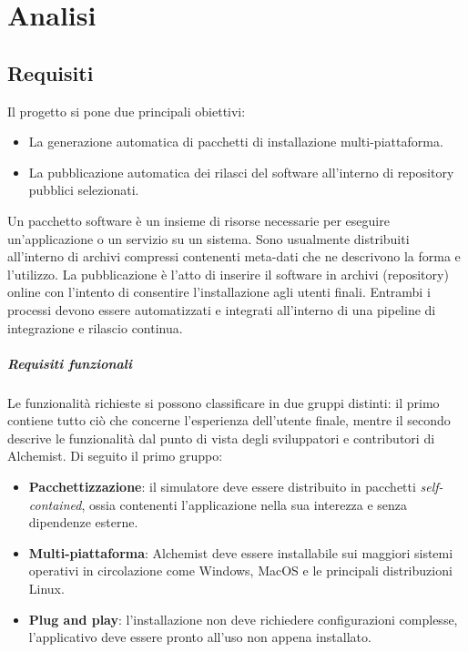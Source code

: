 
\chapter{Analisi}

\section{Requisiti}

Il progetto si pone due principali obiettivi:
\begin{itemize}
	\item La generazione automatica di pacchetti di installazione multi-piattaforma.
	\item La pubblicazione automatica dei rilasci del software all'interno di repository pubblici selezionati.
\end{itemize}
Un pacchetto software è un insieme di risorse necessarie per eseguire un'applicazione o un servizio su un sistema. Sono usualmente distribuiti all'interno di archivi compressi contenenti meta-dati che ne descrivono la forma e l'utilizzo. La pubblicazione è l'atto di inserire il software in archivi (repository) online con l'intento di consentire l'installazione agli utenti finali. Entrambi i processi devono essere automatizzati e integrati all'interno di una pipeline di integrazione e rilascio continua.

\paragraph{Requisiti funzionali}

Le funzionalità richieste si possono classificare in due gruppi distinti: il primo contiene tutto ciò che concerne l'esperienza dell'utente finale, mentre il secondo descrive le funzionalità dal punto di vista degli sviluppatori e contributori di Alchemist. Di seguito il primo gruppo:
\begin{itemize}
	\item \textbf{Pacchettizzazione}: il simulatore deve essere distribuito in pacchetti \textit{self-contained}, ossia contenenti l'applicazione nella sua interezza e senza dipendenze esterne.
	\item \textbf{Multi-piattaforma}: Alchemist deve essere installabile sui maggiori sistemi operativi in circolazione come Windows, MacOS e le principali distribuzioni Linux.
	\item \textbf{Plug and play}: l'installazione non deve richiedere configurazioni complesse, l'applicativo deve essere pronto all'uso non appena installato.
\end{itemize}


